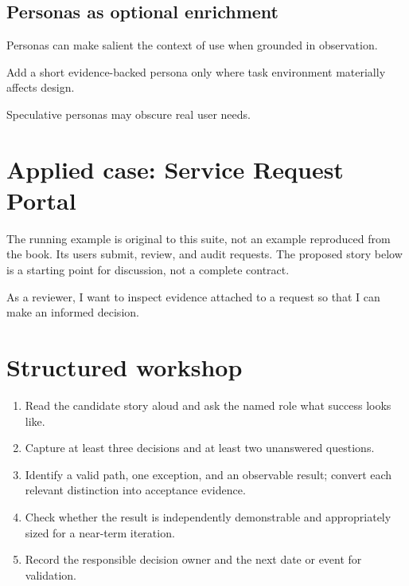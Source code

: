 \documentclass[11pt,letterpaper]{article}
\begin{document}
\subsection{Personas as optional enrichment}
Personas can make salient the context of use when grounded in observation.

\begin{tcolorbox}[colback=tealback,colframe=navy,title={Engineering translation},breakable]
Add a short evidence-backed persona only where task environment materially affects design.

\end{tcolorbox}
\begin{tcolorbox}[colback=amberback,colframe=navy,title={Failure mode to watch},breakable]
Speculative personas may obscure real user needs.

\end{tcolorbox}
\section{Applied case: Service Request Portal}
The running example is original to this suite, not an example reproduced from the book. Its users submit, review, and audit requests. The proposed story below is a starting point for discussion, not a complete contract.

\begin{tcolorbox}[colback=blueback,colframe=navy,title={Candidate story},breakable]
As a reviewer, I want to inspect evidence attached to a request so that I can make an informed decision.

\end{tcolorbox}
\section{Structured workshop}
\begin{enumerate}[leftmargin=*,itemsep=3pt]
\item Read the candidate story aloud and ask the named role what success looks like.
\item Capture at least three decisions and at least two unanswered questions.
\item Identify a valid path, one exception, and an observable result; convert each relevant distinction into acceptance evidence.
\item Check whether the result is independently demonstrable and appropriately sized for a near-term iteration.
\item Record the responsible decision owner and the next date or event for validation.
\end{enumerate}
\end{document}
